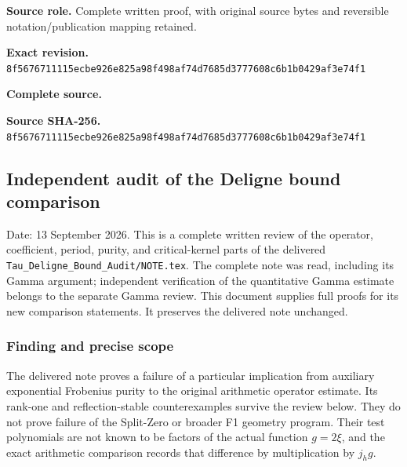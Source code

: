 \documentclass{article}
\begin{document}
\maketitle
\begingroup
\sloppy
\small

\noindent\textbf{Source role.} Complete written proof, with original source bytes and reversible notation/publication mapping retained.\par
\noindent\textbf{Exact revision.} \nolinkurl{8f5676711115ecbe926e825a98f498af74d7685d3777608c6b1b0429af3e74f1}\par
\noindent\textbf{Complete source.} \par
\noindent\textbf{Source SHA-256.} \nolinkurl{8f5676711115ecbe926e825a98f498af74d7685d3777608c6b1b0429af3e74f1}\par\medskip
\subsection{Independent audit of the Deligne bound comparison}\label{endpoint-purity_review--independent-audit-of-the-deligne-bound-comparison}

Date: 13 September 2026. This is a complete written review of the operator, coefficient, period, purity, and critical-kernel parts of the delivered \nolinkurl{Tau_Deligne_Bound_Audit/NOTE.tex}. The complete note was read, including its Gamma argument; independent verification of the quantitative Gamma estimate belongs to the separate Gamma review. This document supplies full proofs for its new comparison statements. It preserves the delivered note unchanged.

\subsubsection{Finding and precise scope}\label{endpoint-purity_review--finding-and-precise-scope}

The delivered note proves a failure of a particular implication from auxiliary exponential Frobenius purity to the original arithmetic operator estimate. Its rank-one and reflection-stable counterexamples survive the review below. They do not prove failure of the Split-Zero or broader F1 geometry program. Their test polynomials are not known to be factors of the actual function \(g=2\xi\), and the exact arithmetic comparison records that difference by multiplication by \(j_hg\).
\end{document}
